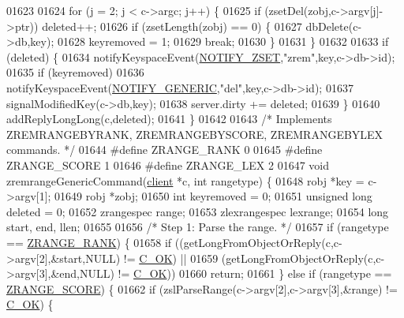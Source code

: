 \begin{DoxyCode}
01623 
01624     \textcolor{keywordflow}{for} (j = 2; j < c->argc; j++) \{
01625         \textcolor{keywordflow}{if} (zsetDel(zobj,c->argv[j]->ptr)) deleted++;
01626         \textcolor{keywordflow}{if} (zsetLength(zobj) == 0) \{
01627             dbDelete(c->db,key);
01628             keyremoved = 1;
01629             \textcolor{keywordflow}{break};
01630         \}
01631     \}
01632 
01633     \textcolor{keywordflow}{if} (deleted) \{
01634         notifyKeyspaceEvent(\hyperlink{server_8h_ab8516a5a3ff1b9eb5f1cb303abef0d2f}{NOTIFY\_ZSET},\textcolor{stringliteral}{"zrem"},key,c->db->id);
01635         \textcolor{keywordflow}{if} (keyremoved)
01636             notifyKeyspaceEvent(\hyperlink{server_8h_a9fa53dd1068e62365f3964ad3479eec2}{NOTIFY\_GENERIC},\textcolor{stringliteral}{"del"},key,c->db->id);
01637         signalModifiedKey(c->db,key);
01638         server.dirty += deleted;
01639     \}
01640     addReplyLongLong(c,deleted);
01641 \}
01642 
01643 \textcolor{comment}{/* Implements ZREMRANGEBYRANK, ZREMRANGEBYSCORE, ZREMRANGEBYLEX commands. */}
01644 \textcolor{preprocessor}{#}\textcolor{preprocessor}{define} \textcolor{preprocessor}{ZRANGE\_RANK} 0
01645 \textcolor{preprocessor}{#}\textcolor{preprocessor}{define} \textcolor{preprocessor}{ZRANGE\_SCORE} 1
01646 \textcolor{preprocessor}{#}\textcolor{preprocessor}{define} \textcolor{preprocessor}{ZRANGE\_LEX} 2
01647 \textcolor{keywordtype}{void} zremrangeGenericCommand(\hyperlink{structclient}{client} *c, \textcolor{keywordtype}{int} rangetype) \{
01648     robj *key = c->argv[1];
01649     robj *zobj;
01650     \textcolor{keywordtype}{int} keyremoved = 0;
01651     \textcolor{keywordtype}{unsigned} \textcolor{keywordtype}{long} deleted = 0;
01652     zrangespec range;
01653     zlexrangespec lexrange;
01654     \textcolor{keywordtype}{long} start, end, llen;
01655 
01656     \textcolor{comment}{/* Step 1: Parse the range. */}
01657     \textcolor{keywordflow}{if} (rangetype == \hyperlink{t__zset_8c_a5efcb596b1e5f49647431b38c2c5dde3}{ZRANGE\_RANK}) \{
01658         \textcolor{keywordflow}{if} ((getLongFromObjectOrReply(c,c->argv[2],&start,NULL) != \hyperlink{server_8h_a303769ef1065076e68731584e758d3e1}{C\_OK}) ||
01659             (getLongFromObjectOrReply(c,c->argv[3],&end,NULL) != \hyperlink{server_8h_a303769ef1065076e68731584e758d3e1}{C\_OK}))
01660             \textcolor{keywordflow}{return};
01661     \} \textcolor{keywordflow}{else} \textcolor{keywordflow}{if} (rangetype == \hyperlink{t__zset_8c_a0ca38ddc10a38a3b5f6b50e2b25fc4ce}{ZRANGE\_SCORE}) \{
01662         \textcolor{keywordflow}{if} (zslParseRange(c->argv[2],c->argv[3],&range) != \hyperlink{server_8h_a303769ef1065076e68731584e758d3e1}{C\_OK}) \{

\end{DoxyCode}
